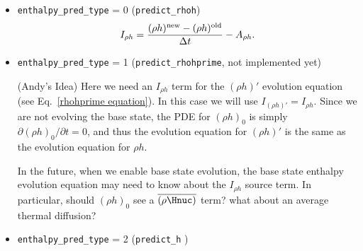 \begin{itemize}
\item {\tt enthalpy\_pred\_type} = 0 ({\tt predict\_rhoh})
\begin{equation}
I_{\rho h} = \frac{(\rho h)^{\rm new} - (\rho h)^{\rm old}}{\Delta t} - A_{\rho h}.
\end{equation}

\item {\tt enthalpy\_pred\_type} = 1 ({\tt predict\_rhohprime}, not implemented yet)

(Andy's Idea) Here we need an $I_{\rho h}$ term for the $(\rho h)'$ evolution
equation (see Eq.~\ref{rhohprime equation}).  In this case we will use
$I_{(\rho h)'} = I_{\rho h}$.  Since we are not evolving the base state, the PDE
for $(\rho h)_0$ is simply $\partial(\rho h)_0/\partial t = 0$, and thus the
evolution equation for $(\rho h)'$ is the same as the evolution equation
for $\rho h$.

In the future, when we enable base state evolution, the base state enthalpy
evolution equation may need to know about the $I_{\rho h}$ source term.
In particular, should $(\rho h)_0$ see a $\overline{(\rho \Hnuc)}$ term?
what about an average thermal diffusion?

\item {\tt enthalpy\_pred\_type} = 2 ({\tt predict\_h} )


\end{itemize}

